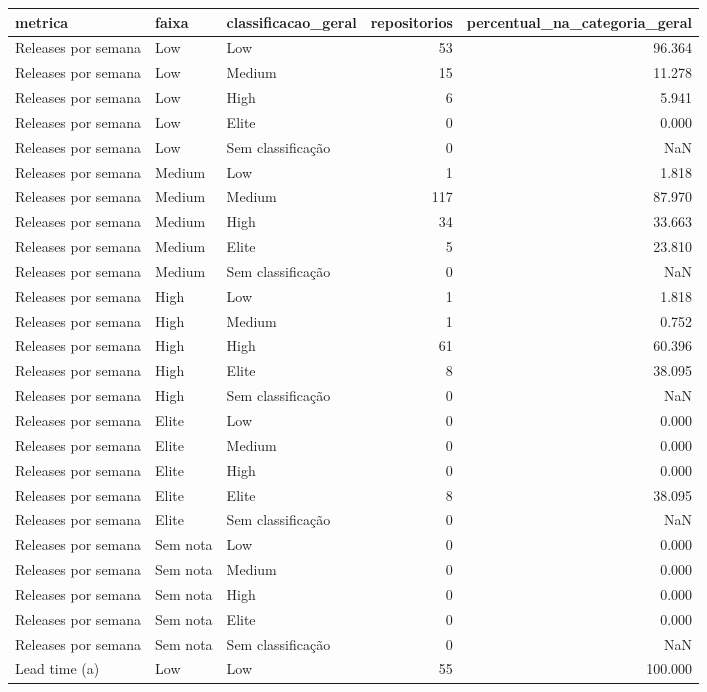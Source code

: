 \begin{tabular}{lllrr}
\toprule
metrica & faixa & classificacao_geral & repositorios & percentual_na_categoria_geral \\
\midrule
Releases por semana & Low & Low & 53 & 96.364 \\
Releases por semana & Low & Medium & 15 & 11.278 \\
Releases por semana & Low & High & 6 & 5.941 \\
Releases por semana & Low & Elite & 0 & 0.000 \\
Releases por semana & Low & Sem classificação & 0 & NaN \\
Releases por semana & Medium & Low & 1 & 1.818 \\
Releases por semana & Medium & Medium & 117 & 87.970 \\
Releases por semana & Medium & High & 34 & 33.663 \\
Releases por semana & Medium & Elite & 5 & 23.810 \\
Releases por semana & Medium & Sem classificação & 0 & NaN \\
Releases por semana & High & Low & 1 & 1.818 \\
Releases por semana & High & Medium & 1 & 0.752 \\
Releases por semana & High & High & 61 & 60.396 \\
Releases por semana & High & Elite & 8 & 38.095 \\
Releases por semana & High & Sem classificação & 0 & NaN \\
Releases por semana & Elite & Low & 0 & 0.000 \\
Releases por semana & Elite & Medium & 0 & 0.000 \\
Releases por semana & Elite & High & 0 & 0.000 \\
Releases por semana & Elite & Elite & 8 & 38.095 \\
Releases por semana & Elite & Sem classificação & 0 & NaN \\
Releases por semana & Sem nota & Low & 0 & 0.000 \\
Releases por semana & Sem nota & Medium & 0 & 0.000 \\
Releases por semana & Sem nota & High & 0 & 0.000 \\
Releases por semana & Sem nota & Elite & 0 & 0.000 \\
Releases por semana & Sem nota & Sem classificação & 0 & NaN \\
Lead time (a) & Low & Low & 55 & 100.000 \\

\end{tabular}
